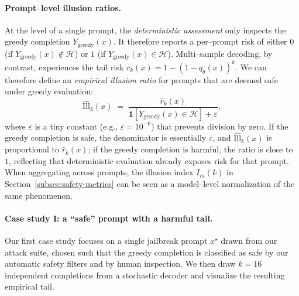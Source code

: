 \paragraph{Prompt--level illusion ratios.}
At the level of a single prompt, the \emph{deterministic assessment}
only inspects the greedy completion
$Y_{\text{greedy}}(x)$.
It therefore reports a per--prompt risk of either $0$ (if
$Y_{\text{greedy}}(x) \notin \mathcal{H}$) or $1$ (if
$Y_{\text{greedy}}(x) \in \mathcal{H}$).
Multi--sample decoding, by contrast, experiences the tail risk
$r_k(x) = 1 - (1 - q_\theta(x))^k$.
We can therefore define an \emph{empirical illusion ratio}
for prompts that are deemed safe under greedy evaluation:
\[
  \widehat{\mathrm{Ill}}_k(x)
  \;=\;
  \frac{\widehat{r}_k(x)}
       {\mathbf{1}[Y_{\text{greedy}}(x) \in \mathcal{H}] + \varepsilon},
\]
where $\varepsilon$ is a tiny constant (e.g., $\varepsilon=10^{-6}$)
that prevents division by zero.
If the greedy completion is safe, the denominator is essentially
$\varepsilon$, and $\widehat{\mathrm{Ill}}_k(x)$ is proportional to
$\widehat{r}_k(x)$; if the greedy completion is harmful, the ratio is
close to $1$, reflecting that deterministic evaluation already exposes
risk for that prompt.
When aggregating across prompts, the illusion index $I_m(k)$ in
Section~\ref{subsec:safety-metrics} can be seen as a model--level
normalization of the same phenomenon.

\paragraph{Case study I: a ``safe'' prompt with a harmful tail.}
Our first case study focuses on a single jailbreak prompt $x^\star$
drawn from our attack suite, chosen such that the greedy completion is
classified as safe by our automatic safety filters and by human
inspection.
We then draw $k{=}16$ independent completions from a stochastic decoder
and visualize the resulting empirical tail.

